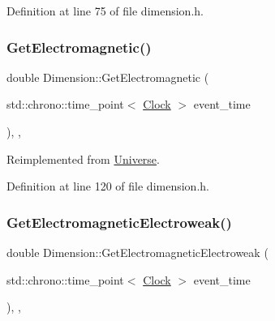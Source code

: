 Definition at line 75 of file dimension.\+h.

\mbox{\label{class_dimension_a21783c29a576518b722512f1245fa598}} 
\subsubsection{\texorpdfstring{Get\+Electromagnetic()}{GetElectromagnetic()}}
{\footnotesize\ttfamily double Dimension\+::\+Get\+Electromagnetic (\begin{DoxyParamCaption}\item[{std\+::chrono\+::time\+\_\+point$<$ \mbox{\hyperlink{universe_8h_a0ef8d951d1ca5ab3cfaf7ab4c7a6fd80}{Clock}} $>$}]{event\+\_\+time }\end{DoxyParamCaption})\hspace{0.3cm}{\ttfamily [inline]}, {\ttfamily [final]}, {\ttfamily [virtual]}}



Reimplemented from \mbox{\hyperlink{class_universe_a63b850ef3f3394313353109d222bf5d1}{Universe}}.



Definition at line 120 of file dimension.\+h.

\mbox{\label{class_dimension_ae1babb1fa280c35966d7ee3de6655e4d}} 
\subsubsection{\texorpdfstring{Get\+Electromagnetic\+Electroweak()}{GetElectromagneticElectroweak()}}
{\footnotesize\ttfamily double Dimension\+::\+Get\+Electromagnetic\+Electroweak (\begin{DoxyParamCaption}\item[{std\+::chrono\+::time\+\_\+point$<$ \mbox{\hyperlink{universe_8h_a0ef8d951d1ca5ab3cfaf7ab4c7a6fd80}{Clock}} $>$}]{event\+\_\+time }\end{DoxyParamCaption})\hspace{0.3cm}{\ttfamily [inline]}, {\ttfamily [final]}, {\ttfamily [virtual]}}



